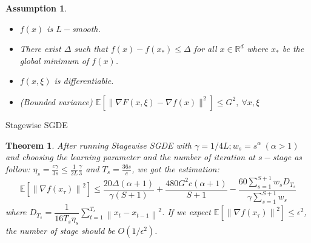 \documentclass{article}
\theoremstyle{theorem}
\newtheorem{theorem}{Theorem}
\newtheorem*{assumption}{Assumption}
\theoremstyle{definition}
\begin{document}
\begin{assumption} \begin{itemize}
	\item $f(x)$ is $L-$smooth.
	\item There exist $\Delta$ such that $f(x)-f(x_*) \leq \Delta$ for all $x \in \mathbb{R}^d$ where $x_*$ be the global minimum of $f(x)$.
	\item $f(x, \xi)$ is differentiable.
	\item (Bounded variance) $\mathbb{E} \left[\| \nabla F(x, \xi)-\nabla f(x)\| ^2\right] \le G^2, \ \forall x, \xi $	
\end{itemize} \end{assumption}
\begin{algorithm}[H]
	\SetAlgoLined\DontPrintSemicolon
	\setcounter{AlgoLine}{0}
	\caption{Stagewise SGDE}
\end{algorithm} 
\begin{theorem} \cite{xu2019convergence}
 After running Stagewise SGDE with $\gamma= 1/4L; w_s=s^\alpha \ (\alpha >1)$ and choosing the learning parameter and the number of iteration at $s-$stage as follow: $\eta_s=\frac{c \gamma}{3s} \leq \frac{1}{2L} \frac{\gamma}{3}$ and $T_s=\frac{36s}{c}$, we got the estimation:
$$\mathbb{E} \left[ \left\|\nabla f(x_{\tau})\right\|^2 \right] \leq \dfrac{20 \Delta(\alpha +1)}{\gamma (S+1)}+\dfrac{480G^2c(\alpha +1)}{S+1}-\dfrac{60 \sum_{s=1}^{S+1}w_s D_{T_s}}{\gamma \sum_{s=1}^{S+1}w_s}$$ where $D_{T_s}=\dfrac{1}{16T_s \eta_s} \sum_{t=1}^{T_s} \left\|x_t -x_{t-1}\right\|^2$. If we expect $\mathbb{E} \left[ \left\|\nabla f(x_{\tau})\right\|^2 \right] \leq \epsilon^2$, the number of stage should be $O(1/\epsilon^2)$.
\end{theorem}
\end{document}
